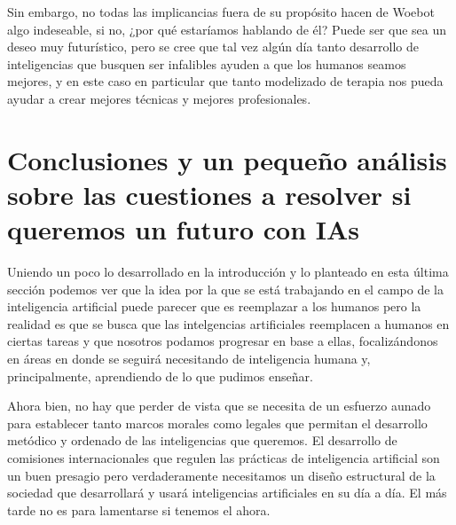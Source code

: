 \documentclass[11pt]{article}
\begin{document}
Sin embargo, no todas las implicancias fuera de su propósito
hacen de Woebot algo indeseable, si no, ¿por qué estaríamos 
hablando de él? Puede ser que sea un deseo muy futurístico,
pero se cree que tal vez algún día tanto desarrollo de 
inteligencias que busquen ser infalibles ayuden a que los
humanos seamos mejores, y en este caso en particular que 
tanto modelizado de terapia nos pueda ayudar a crear 
mejores técnicas y mejores profesionales.


\section{Conclusiones y un pequeño análisis sobre las cuestiones a resolver si queremos un futuro con IAs}
Uniendo un poco lo desarrollado en la introducción y
lo planteado en esta última sección podemos ver que la 
idea por la que se está trabajando en el campo de la 
inteligencia artificial puede parecer que es 
reemplazar a los humanos pero la realidad es que se busca
que las intelgencias artificiales reemplacen a humanos en 
ciertas tareas y que nosotros podamos progresar en base a 
ellas, focalizándonos en áreas en donde se seguirá 
necesitando de inteligencia humana y, principalmente, 
aprendiendo de lo que pudimos enseñar.

Ahora bien, no hay que perder de vista que se necesita 
de un esfuerzo aunado para establecer
tanto marcos morales como legales que permitan el desarrollo 
metódico y ordenado
de las inteligencias que queremos. El desarrollo de 
comisiones internacionales que regulen las 
prácticas de inteligencia artificial son un buen presagio 
pero verdaderamente necesitamos un diseño estructural 
de la sociedad que desarrollará y usará inteligencias 
artificiales en su día a día. El más tarde no es
para lamentarse si tenemos el ahora.


\end{document}
